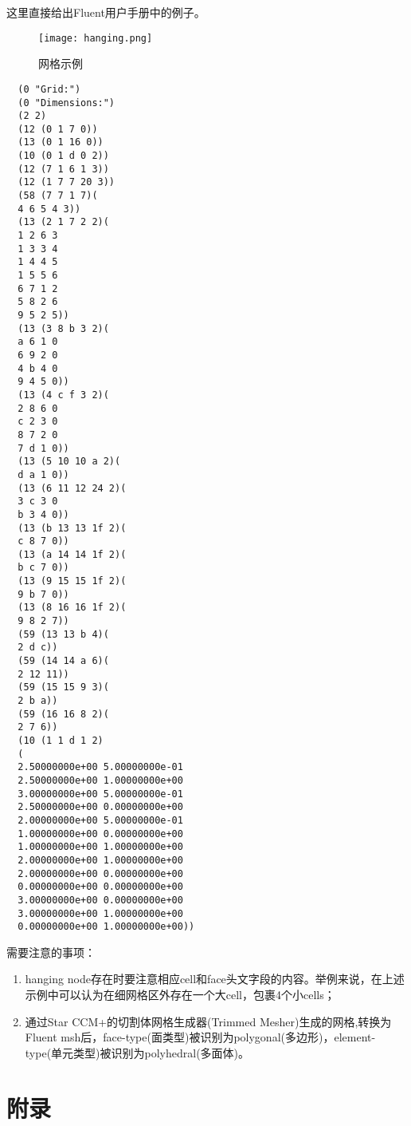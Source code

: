 \documentclass[lang=cn,11pt,a4paper]{elegantpaper}
\begin{document}
这里直接给出Fluent用户手册中的例子。
\begin{figure}[!htb]
  \centering
  \texttt{[image: hanging.png]}
  \caption{网格示例}
  \label{hanging}
  \end{figure}
\begin{lstlisting}
  (0 "Grid:")
  (0 "Dimensions:")
  (2 2)
  (12 (0 1 7 0))
  (13 (0 1 16 0))
  (10 (0 1 d 0 2))
  (12 (7 1 6 1 3))
  (12 (1 7 7 20 3))
  (58 (7 7 1 7)(
  4 6 5 4 3))
  (13 (2 1 7 2 2)(
  1 2 6 3 
  1 3 3 4 
  1 4 4 5 
  1 5 5 6 
  6 7 1 2 
  5 8 2 6 
  9 5 2 5))
  (13 (3 8 b 3 2)(
  a 6 1 0 
  6 9 2 0 
  4 b 4 0 
  9 4 5 0))
  (13 (4 c f 3 2)(
  2 8 6 0 
  c 2 3 0 
  8 7 2 0 
  7 d 1 0))
  (13 (5 10 10 a 2)(
  d a 1 0))
  (13 (6 11 12 24 2)(
  3 c 3 0 
  b 3 4 0))
  (13 (b 13 13 1f 2)(
  c 8 7 0))
  (13 (a 14 14 1f 2)(
  b c 7 0))
  (13 (9 15 15 1f 2)(
  9 b 7 0))
  (13 (8 16 16 1f 2)(
  9 8 2 7))
  (59 (13 13 b 4)(
  2 d c))
  (59 (14 14 a 6)(
  2 12 11))
  (59 (15 15 9 3)(
  2 b a))
  (59 (16 16 8 2)(
  2 7 6))
  (10 (1 1 d 1 2)
  (
  2.50000000e+00 5.00000000e-01
  2.50000000e+00 1.00000000e+00
  3.00000000e+00 5.00000000e-01
  2.50000000e+00 0.00000000e+00
  2.00000000e+00 5.00000000e-01
  1.00000000e+00 0.00000000e+00
  1.00000000e+00 1.00000000e+00
  2.00000000e+00 1.00000000e+00
  2.00000000e+00 0.00000000e+00
  0.00000000e+00 0.00000000e+00
  3.00000000e+00 0.00000000e+00
  3.00000000e+00 1.00000000e+00
  0.00000000e+00 1.00000000e+00))
\end{lstlisting}

需要注意的事项：
\begin{enumerate}
  \item hanging node存在时要注意相应cell和face头文字段的内容。举例来说，在上述示例中可以认为在细网格区外存在一个大cell，包裹4个小cells；
  \item 通过Star CCM+的切割体网格生成器(Trimmed Mesher)生成的网格,转换为Fluent msh后，face-type(面类型)被识别为polygonal(多边形)，element-type(单元类型)被识别为polyhedral(多面体)。
\end{enumerate}


\section{附录}
\end{document}
